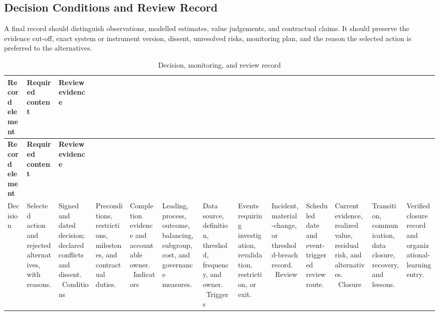\subsection{Decision Conditions and Review Record}
\label{sec:comp-ch01-supp-3}
A final record should distinguish observations, modelled estimates, value
judgements, and contractual claims. It should preserve the evidence cut-off, exact
system or instrument version, dissent, unresolved risks, monitoring plan, and the
reason the selected action is preferred to the alternatives.

\begin{longtable}{@{}p{}p{}p{}@{}}
\caption{Decision, monitoring, and review record}
\label{tab:comp-ch01-decision-record}\\
\toprule
\textbf{Record element} & \textbf{Required content} & \textbf{Review evidence} \\
\midrule
\endfirsthead
\toprule
\textbf{Record element} & \textbf{Required content} & \textbf{Review evidence} \\
\midrule
\endhead
\bottomrule
\endlastfoot
Decision & Selected action and rejected alternatives, with reasons. & Signed and dated decision; declared conflicts and dissent. \
Conditions & Preconditions, restrictions, milestones, and contractual duties. & Completion evidence and accountable owner. \
Indicators & Leading, process, outcome, balancing, subgroup, cost, and governance measures. & Data source, definition, threshold, frequency, and owner. \
Triggers & Events requiring investigation, revalidation, restriction, or exit. & Incident, material-change, or threshold-breach record. \
Review & Scheduled date and event-triggered review route. & Current evidence, realized value, residual risk, and alternatives. \
Closure & Transition, communication, data closure, recovery, and lessons. & Verified closure record and organizational-learning entry. \
\end{longtable}
